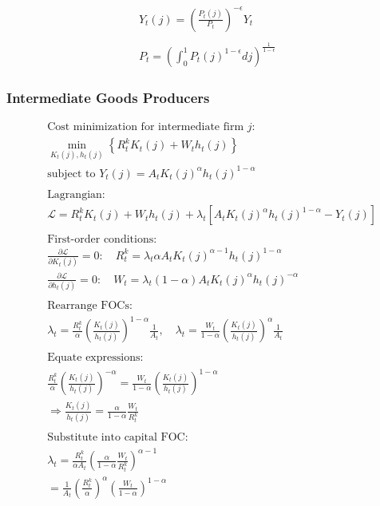 \documentclass[11pt,preprint]{elsarticle}
\numberwithin{equation}{section}
\numberwithin{figure}{section}
\numberwithin{table}{section}
\begin{document}
\begin{equation}\label{demand_and_price}  
\boxed{  
  \begin{gathered}  
  Y_t(j) = \left( \frac{P_t(j)}{P_t} \right)^{-\epsilon} Y_t \\  
  \\  
  P_t = \left( \int_0^1 P_t(j)^{1-\epsilon}  dj \right)^{\frac{1}{1-\epsilon}}  
  \end{gathered}  
}  
\end{equation}

\subsubsection{\texorpdfstring{Intermediate Goods Producers
\label{intermediate_good_producer_appendix}}{Intermediate Goods Producers }}\label{intermediate-goods-producers-1}

\begin{align*}
& \text{Cost minimization for intermediate firm } j: \\
& \min_{K_t(j), h_t(j)} \left\{ R_t^k K_t(j) + W_t h_t(j) \right\} \\
& \text{subject to } Y_t(j) = A_t K_t(j)^{\alpha} h_t(j)^{1-\alpha} \\
& \\
& \text{Lagrangian:} \\
& \mathcal{L} = R_t^k K_t(j) + W_t h_t(j) + \lambda_t \left[ A_t K_t(j)^{\alpha} h_t(j)^{1-\alpha} - Y_t(j) \right] \\
& \\
& \text{First-order conditions:} \\
& \frac{\partial \mathcal{L}}{\partial K_t(j)} = 0: \quad R_t^k = \lambda_t \alpha A_t K_t(j)^{\alpha-1} h_t(j)^{1-\alpha} \\
& \frac{\partial \mathcal{L}}{\partial h_t(j)} = 0: \quad W_t = \lambda_t (1-\alpha) A_t K_t(j)^{\alpha} h_t(j)^{-\alpha} \\
& \\
& \text{Rearrange FOCs:} \\
& \lambda_t = \frac{R_t^k}{\alpha} \left( \frac{K_t(j)}{h_t(j)} \right)^{1-\alpha} \frac{1}{A_t}, \quad 
\lambda_t = \frac{W_t}{1-\alpha} \left( \frac{K_t(j)}{h_t(j)} \right)^{\alpha} \frac{1}{A_t} \\
& \\
& \text{Equate expressions:} \\
& \frac{R_t^k}{\alpha} \left( \frac{K_t(j)}{h_t(j)} \right)^{-\alpha} = \frac{W_t}{1-\alpha} \left( \frac{K_t(j)}{h_t(j)} \right)^{1-\alpha} \\
& \Rightarrow \frac{K_t(j)}{h_t(j)} = \frac{\alpha}{1-\alpha} \frac{W_t}{R_t^k} \\
& \\
& \text{Substitute into capital FOC:} \\
& \lambda_t = \frac{R_t^k}{\alpha A_t} \left( \frac{\alpha}{1-\alpha} \frac{W_t}{R_t^k} \right)^{\alpha-1} \\
& = \frac{1}{A_t} \left( \frac{R_t^k}{\alpha} \right)^{\alpha} \left( \frac{W_t}{1-\alpha} \right)^{1-\alpha}
\end{align*}
\end{document}
